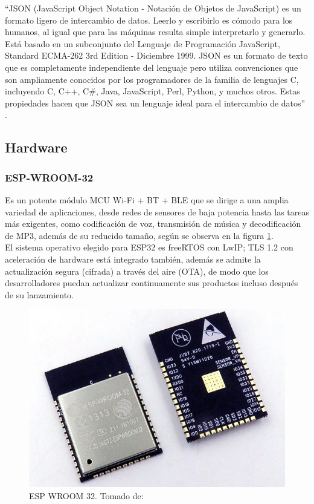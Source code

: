 ``JSON (JavaScript Object Notation - Notación de Objetos de JavaScript) es un formato ligero de intercambio de datos. Leerlo y escribirlo es cómodo para los humanos, al igual que para las máquinas resulta simple interpretarlo y generarlo. Está basado en un subconjunto del Lenguaje de Programación JavaScript, Standard ECMA-262 3rd Edition - Diciembre 1999. JSON es un formato de texto que es completamente independiente del lenguaje pero utiliza convenciones que son ampliamente conocidos por los programadores de la familia de lenguajes C, incluyendo C, C++, C\#, Java, JavaScript, Perl, Python, y muchos otros. Estas propiedades hacen que JSON sea un lenguaje ideal para el intercambio de datos'' \cite{JSON}.\\

\subsection{Hardware}

\subsubsection{ESP-WROOM-32}

Es un potente módulo MCU Wi-Fi + BT + BLE que se dirige a una amplia variedad de aplicaciones, desde redes de sensores de baja potencia hasta las tareas más exigentes, como codificación de voz, transmisión de música y decodificación de MP3, además de su reducido tamaño, según se observa en la figura \ref{fig:esp32-wroom-s32-00}.\\

El sistema operativo elegido para ESP32 es freeRTOS con LwIP; TLS 1.2 con aceleración de hardware está integrado también, además se admite la actualización segura (cifrada) a través del aire (OTA), de modo que los desarrolladores puedan actualizar continuamente sus productos incluso después de su lanzamiento.\cite{EW32}\\

\begin{figure}[!t]
	\centering
	\caption{ESP WROOM 32. Tomado de: \cite{ESPIMG}}
	\label{fig:esp32-wroom-s32-00}
	\includegraphics[width=0.6\linewidth]{Imagenes/esp32-wroom-s32-00}
\end{figure}

